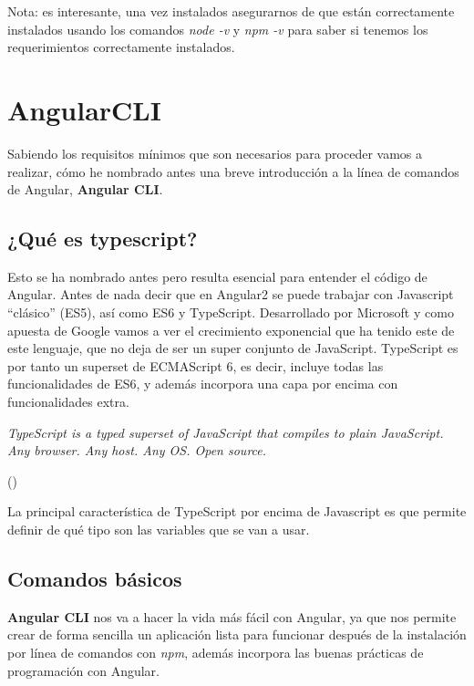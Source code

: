 Nota: es interesante, una vez instalados asegurarnos de que están correctamente instalados usando los comandos \emph{node -v} y \emph{npm -v} para saber si tenemos los requerimientos correctamente instalados.


\section{AngularCLI}\label{angularCLI}
Sabiendo los requisitos mínimos que son necesarios para proceder vamos a realizar, cómo he nombrado antes una breve introducción a la línea de comandos de Angular,  \textbf{Angular CLI}.

\subsection{¿Qué es typescript?}\label{typesript}
Esto se ha nombrado antes pero resulta esencial para entender el código de Angular. Antes de nada decir que en Angular2 se puede trabajar con Javascript “clásico” (ES5), así como ES6 y TypeScript. Desarrollado por Microsoft y como apuesta de Google vamos a ver el crecimiento exponencial que ha tenido este de este lenguaje, que no deja de ser un super conjunto de JavaScript. 
 TypeScript es por tanto un superset de ECMAScript 6, es decir, incluye todas las funcionalidades de ES6, y además incorpora una capa por encima con funcionalidades extra.

\begin{center}
    \begin{minipage}{0.9\linewidth}
        \vspace{5pt}%
        {\small
            \emph{TypeScript is a typed superset of JavaScript that compiles to plain JavaScript. Any browser. Any host. Any OS. Open source.}
        }
        \begin{flushright}
            (\cite{TypeScript Web})
        \end{flushright}
        \vspace{5pt}%
    \end{minipage}
\end{center}

La principal característica de TypeScript por encima de Javascript es que permite definir de qué tipo son las variables que se van a usar.

\subsection{Comandos básicos}\label{cbasicos}
\textbf{Angular CLI} nos va a hacer la vida más fácil con Angular, ya que nos permite crear de forma sencilla un aplicación lista para funcionar después de la instalación por línea de comandos con \emph{npm}, además incorpora las buenas prácticas de programación con Angular. 

